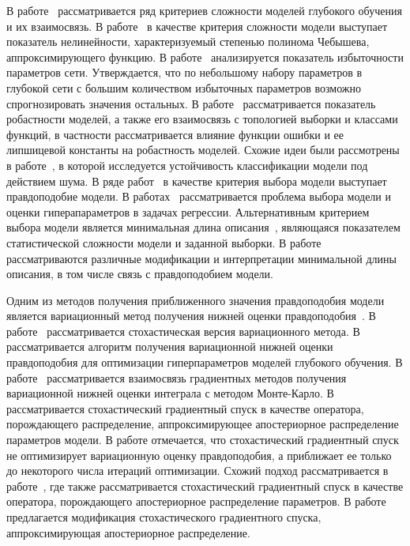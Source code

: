 В работе~\cite{perekrestenko} рассматривается ряд критериев сложности моделей глубокого обучения и их взаимосвязь. В работе~\cite{vladis} в качестве критерия сложности модели выступает показатель нелинейности, характеризуемый степенью полинома Чебышева, аппроксимирующего функцию. В работе~\cite{need_prune} анализируется показатель избыточности параметров сети. Утверждается, что по небольшому набору параметров в глубокой сети с большим количеством избыточных параметров возможно спрогнозировать значения остальных. В работе~\cite{rob} рассматривается показатель робастности моделей, а также его взаимосвязь с топологией выборки и классами функций, в частности рассматривается влияние функции ошибки и ее липшицевой константы на робастность моделей. Схожие идеи были рассмотрены в работе~\cite{intrig}, в которой исследуется устойчивость классификации модели под действием шума. 
В ряде работ~\cite{MacKay,Bishop,tokmakova,zaitsev,strijov_webber, strijov_dsc} в качестве критерия выбора модели  выступает правдоподобие модели. В работах~\cite{tokmakova,zaitsev,strijov_webber, strijov_dsc} рассматривается проблема выбора модели и оценки гиперапараметров в задачах регрессии. Альтернативным критерием выбора модели является минимальная длина описания~\cite{mdl}, являющаяся показателем статистической сложности модели и заданной выборки. В работе~\cite{mdl} рассматриваются различные модификации и интерпретации минимальной длины описания, в том числе связь с правдоподобием модели.

Одним из методов получения приближенного значения правдоподобия модели является вариационный метод получения нижней оценки правдоподобия~\cite{Bishop}.  В работе~\cite{hoffman} рассматривается стохастическая версия вариационного метода.
В~\cite{nips} рассматривается алгоритм получения вариационной нижней оценки правдоподобия  для оптимизации гиперпараметров моделей глубокого обучения. 
В работе~\cite{varmc} рассматривается взаимосвязь градиентных методов получения вариационной нижней оценки интеграла с методом Монте-Карло.
В~\cite{early} рассматривается стохастический градиентный спуск в качестве оператора, порождающего распределение, аппроксимирующее апостериорное распределение параметров модели. В работе отмечается, что стохастический градиентный спуск не оптимизирует вариационную оценку правдоподобия, а приближает ее только до некоторого числа итераций оптимизации. 
Схожий подход рассматривается в работе~\cite{sgd_cont}, где также рассматривается стохастический градиентный спуск в качестве оператора, порождающего апостериорное распределение параметров. В работе~\cite{langevin} предлагается модификация стохастического градиентного спуска, аппроксимирующая апостериорное распределение. 


